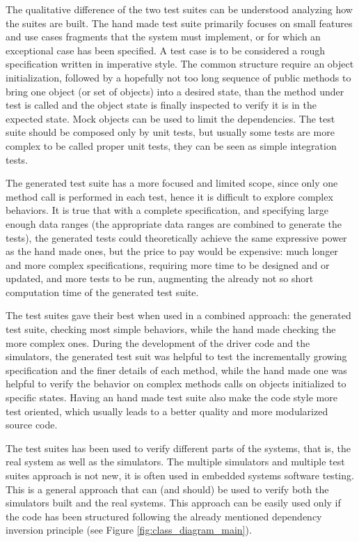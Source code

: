\documentclass{article} \usepackage{times}
\begin{document}
The qualitative difference of the two test suites can be understood
analyzing how the suites are built. The hand made test suite primarily
focuses on small features and use cases fragments that the system must
implement, or for which an exceptional case has been specified. A test
case is to be considered a rough specification written in imperative
style. The common structure require an object initialization, followed
by a hopefully not too long sequence of public methods to bring one
object (or set of objects) into a desired state, than the method under
test is called and the object state is finally inspected to verify it
is in the expected state. Mock objects can be used to limit the
dependencies. The test suite should be composed only by unit tests,
but usually some tests are more complex to be called proper unit
tests, they can be seen as simple integration tests.

The generated test suite has a more focused and limited scope, since
only one method call is performed in each test, hence it is difficult
to explore complex behaviors. It is true that with a complete
specification, and specifying large enough data ranges (the
appropriate data ranges are combined to generate the tests), the
generated tests could theoretically achieve the same expressive power
as the hand made ones, but the price to pay would be expensive: much
longer and more complex specifications, requiring more time to be
designed and or updated, and more tests to be run, augmenting the
already not so short computation time of the generated test suite.

The test suites gave their best when used in a combined approach: the
generated test suite, checking most simple behaviors, while the hand
made checking the more complex ones.  During the development of the
driver code and the simulators, the generated test suit was helpful to
test the incrementally growing specification and the finer details of
each method, while the hand made one was helpful to verify the
behavior on complex methods calls on objects initialized to specific
states. Having an hand made test suite also make the code style more
test oriented, which usually leads to a better quality and more
modularized source code\cite{Binder1999}.

The test suites has been used to verify different parts of the
systems, that is, the real system as well as the simulators.  The
multiple simulators and multiple test suites approach is not new, it
is often used in embedded systems software testing\cite{Broekman2002}.
This is a general approach that can (and should) be used to verify
both the simulators built and the real systems.  This approach can be
easily used only if the code has been structured following the already
mentioned dependency inversion principle\cite{martin1996dependency}
(see Figure \ref{fig:class_diagram_main}).
\end{document}
